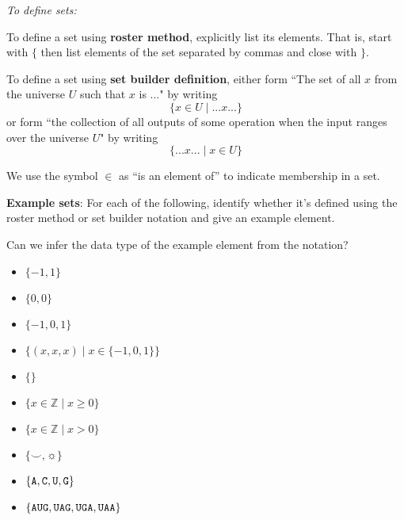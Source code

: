 
{\it To define sets:}

To define a set using {\bf roster method}, explicitly list its elements. That is,
start with $\{$ then list elements of 
the set separated by commas and close with $\}$.

\vfill

To define a set using {\bf set builder definition}, either form 
``The set of all $x$ from the universe $U$ such that $x$ is ..." by writing
\[\{x \in U \mid ...x... \}\]
or form ``the collection of all outputs of some operation when the input ranges over the universe $U$"
by writing
\[\{ ...x... \mid x\in U \}\]

\vfill

We use the symbol $\in$ as ``is an element of'' to indicate membership in a set.\\

\newpage 

{\bf Example sets}: For each of the following, identify whether it's defined using the roster method
or set builder notation and give an example element.

Can we infer the data type of the example element from the notation?

\begin{itemize}
    \item[]$\{ -1, 1\}$
    \vfill
    \item[]$\{0, 0 \}$
    \vfill
    \item[]$\{-1, 0, 1 \}$
    \vfill
    \item[]$\{(x,x,x) \mid x \in \{-1,0,1\} \}$
    \vfill
    \item[]$\{ \}$
    \vfill
    \item[]$\{ x \in \mathbb{Z} \mid x \geq 0 \}$
    \vfill
    \item[]$\{ x \in \mathbb{Z}  \mid x > 0 \}$
    \vfill
    \item[]$\{ \smile, \sun \}$
    \vfill
    \item[]$\{\texttt{A},\texttt{C},\texttt{U},\texttt{G}\}$
    \vfill
    \item[]$\{\texttt{A}\texttt{U}\texttt{G}, \texttt{U}\texttt{A}\texttt{G}, \texttt{U}\texttt{G}\texttt{A}, \texttt{U}\texttt{A}\texttt{A} \}$
    \vfill
\end{itemize}
